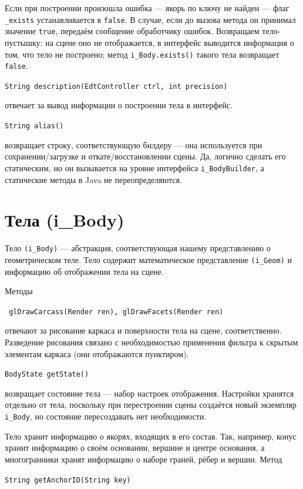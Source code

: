 \documentclass[fontsize=10px, a4paper, openany]{scrbook}
\newcommand{\codeline}[1]{\vspace{5px}\colorbox{light-gray}{\texttt{#1}}\vspace{5px}}
\begin{document}
Если при построении произошла ошибка --- якорь по ключу не найден --- флаг \texttt{\_exists} устанавливается в \texttt{false}. В случае, если до вызова метода он принимал значение \texttt{true}, передаём сообщение обработчику ошибок. Возвращаем тело-пустышку\label{ref:nullbody}: на сцене оно не отображается, в интерфейс выводится информация о том, что тело не построено; метод \texttt{i\_Body.exists()} такого тела возвращает \texttt{false}.

\codeline{String description(EdtController ctrl, int precision)}

отвечает за вывод информации о построении тела в интерфейс.

\codeline{String alias()}

возвращает строку, соответствующую билдеру --- она используется при сохранении/загрузке и откате/восстановлении сцены. Да, логично сделать его статическим, но он вызывается на уровне интерфейса \texttt{i\_BodyBuilder}, а статические методы в Java не переопределяются.

\section{Тела (i\_Body)}

Тело \texttt{(i\_Body)} --- абстракция, соответствующая нашему представлению о геометрическом теле. Тело содержит математическое представление \texttt{(i\_Geom)} и информацию об отображении тела на сцене.

Методы

\codeline{
  glDrawCarcass(Render ren), glDrawFacets(Render ren)
}

отвечают за рисование каркаса и поверхности тела на сцене, соответственно. Разведение рисования связано с необходимостью применения фильтра к скрытым элементам каркаса (они отображаются пунктиром).

\codeline{BodyState getState()}

возвращает состояние тела --- набор настроек отображения. Настройки хранятся отдельно от тела, поскольку при перестроении сцены создаётся новый экземпляр \texttt{i\_Body}, но состояние пересоздавать нет необходимости.

Тело хранит информацию о якорях, входящих в его состав. Так, например, конус хранит информацию о своём основании, вершине и центре основания, а многогранники хранят информацию о наборе граней, рёбер и вершин. Метод

\codeline{String getAnchorID(String key)}
\end{document}
